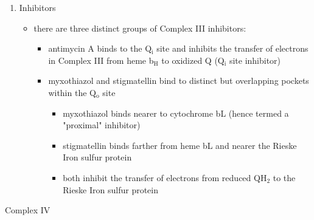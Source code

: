 \documentclass{scrartcl}
\begin{document}
\begin{enumerate}
\item Inhibitors
\label{sec:orgb72333b}
\begin{itemize}
\item there are three distinct groups of Complex III inhibitors:
\begin{itemize}
\item antimycin A binds to the Q\(_{\text{i}}\) site and inhibits the transfer of electrons in Complex III from heme b\(_{\text{H}}\) to oxidized Q (Q\(_{\text{i}}\) site inhibitor)
\item myxothiazol and stigmatellin bind to distinct but overlapping pockets within the Q\(_{\text{o}}\) site
\begin{itemize}
\item myxothiazol binds nearer to cytochrome bL (hence termed a "proximal" inhibitor)
\item stigmatellin binds farther from heme bL and nearer the Rieske Iron sulfur protein
\item both inhibit the transfer of electrons from reduced QH\(_{\text{2}}\) to the Rieske Iron sulfur protein
\end{itemize}
\end{itemize}
\end{itemize}
\end{enumerate}
\item Complex IV
\label{sec:org4343bd0}
\end{document}
